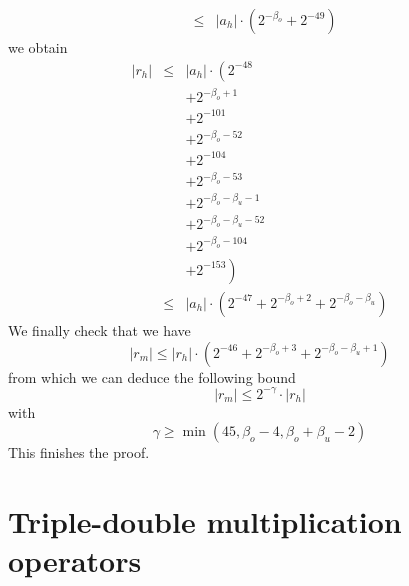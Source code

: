 \documentclass[a4paper,10pt,twoside]{article}
\newenvironment{proof}[1][Proof]{\begin{trivlist}
\item[\hskip \labelsep {\bfseries #1}]}{\end{trivlist}}
\newcommand{\qed}{\nobreak \ifvmode \relax \else \ifdim \lastskip<1.5em \hskip-\lastskip
\hskip1.5em plus0em minus0.5em \fi \nobreak \vrule height0.75em width0.5em depth0.25em\fi}
\newcommand{\hi}{\ensuremath{\mathit{h}}}
\newcommand{\mi}{\ensuremath{\mathit{m}}}
\begin{document}
\begin{proof}
\begin{eqnarray*}
& \leq & \left \vert a_\hi \right \vert \cdot \left( 2^{-\beta_o} + 2^{-49} \right)
\end{eqnarray*}
we obtain
\begin{eqnarray*}
\left \vert r_\hi \right \vert & \leq & \left \vert a_\hi \right \vert \cdot
\left( 2^{-48} \right. \\
& & + 2^{-\beta_o+1} \\
& & + 2^{-101} \\
& & + 2^{-\beta_o-52} \\
& & + 2^{-104} \\
& & + 2^{-\beta_o-53} \\
& & + 2^{-\beta_o-\beta_u-1} \\
& & + 2^{-\beta_o-\beta_u-52} \\
& & + 2^{-\beta_o-104} \\
& & \left. + 2^{-153} \right) \\
& \leq & \left \vert a_\hi \right \vert \cdot
\left( 2^{-47} + 2^{-\beta_o+2} + 2^{-\beta_o-\beta_u} \right)
\end{eqnarray*}
We finally check that we have
$$\left \vert r_\mi \right \vert \leq \left \vert r_\hi \right \vert \cdot \left( 2^{-46} + 2^{-\beta_o+3} + 2^{-\beta_o-\beta_u+1} \right)$$
from which we can deduce the following bound
$$\left \vert r_\mi \right \vert \leq 2^{-\gamma} \cdot \left \vert r_\hi \right \vert$$
with
$$\gamma \geq \min\left( 45, \beta_o-4, \beta_o+\beta_u-2 \right)$$
This finishes the proof.\qed
\end{proof}
\section{Triple-double multiplication operators}
\end{document}
